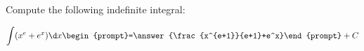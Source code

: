 \documentclass{ximera}
\author{Jim Talamo}
\begin{document}
\begin{exercise}
Compute the following indefinite integral:

\[
\int (x^{e}+e^x) \d x 
\begin{prompt}=\answer{\frac{x^{e+1}}{e+1}+e^x}\end{prompt}+C
\]
\end{exercise}
\end{document}

